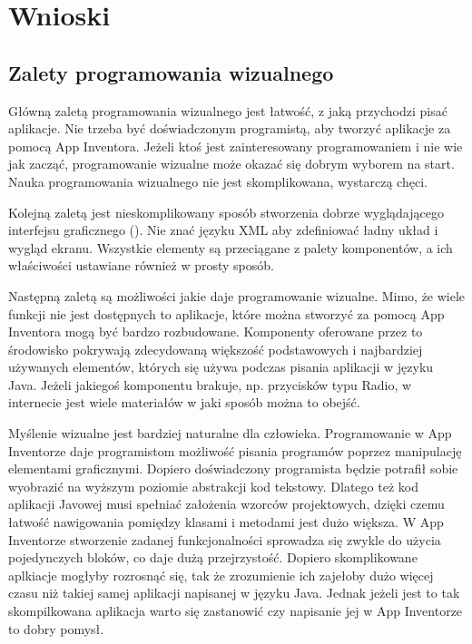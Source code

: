 \chapter{Wnioski}
\label{c6}

\section{Zalety programowania wizualnego}

Główną zaletą programowania wizualnego jest łatwość, z jaką przychodzi pisać aplikacje. Nie trzeba być doświadczonym programistą, aby tworzyć aplikacje za pomocą App Inventora. Jeżeli ktoś jest zainteresowany programowaniem i nie wie jak zacząć, programowanie wizualne może okazać się dobrym wyborem na start. Nauka programowania wizualnego nie jest skomplikowana, wystarczą chęci. 

Kolejną zaletą jest nieskomplikowany sposób stworzenia dobrze wyglądającego interfejsu graficznego (). Nie znać języku XML aby zdefiniować ładny układ i wygląd ekranu. Wszystkie elementy są przeciągane z palety komponentów, a ich właściwości ustawiane również w prosty sposób.

Następną zaletą są możliwości jakie daje programowanie wizualne. Mimo, że wiele funkcji nie jest dostępnych to aplikacje, które można stworzyć za pomocą App Inventora mogą być bardzo rozbudowane. Komponenty oferowane przez to środowisko pokrywają zdecydowaną większość podstawowych i najbardziej używanych elementów, których się używa podczas pisania aplikacji w języku Java. Jeżeli jakiegoś komponentu brakuje, np. przycisków typu Radio, w internecie jest wiele materiałów w jaki sposób można to obejść.

Myślenie wizualne jest bardziej naturalne dla człowieka. Programowanie w App Inventorze daje programistom możliwość pisania programów poprzez manipulację elementami graficznymi. Dopiero doświadczony programista będzie potrafił sobie wyobrazić na wyższym poziomie abstrakcji kod tekstowy. Dlatego też kod aplikacji Javowej musi spełniać założenia wzorców projektowych, dzięki czemu łatwość nawigowania pomiędzy klasami i metodami jest dużo większa. W App Inventorze stworzenie zadanej funkcjonalności sprowadza się zwykle do użycia pojedynczych bloków, co daje dużą przejrzystość. Dopiero skomplikowane aplkiacje mogłyby rozrosnąć się, tak że zrozumienie ich zajełoby dużo więcej czasu niż takiej samej aplikacji napisanej w języku Java. Jednak jeżeli jest to tak skompilkowana aplikacja warto się zastanowić czy napisanie jej w App Inventorze to dobry pomysł.


